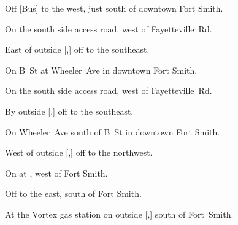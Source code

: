 
\begin{LocationList}

Off [Bus] to the west, just south of downtown Fort Smith.

On the south side  access road, west of  Fayetteville~Rd.

East of  outside [,] off  to the southeast.

On B~St at  Wheeler~Ave in downtown Fort Smith.

On the south side  access road, west of  Fayetteville~Rd.

\Location{\GarageHQ \Garage}
By  outside [,] off  to the southeast.

On  Wheeler~Ave south of B~St in downtown Fort Smith.

West of  outside [,] off  to the northwest.

\Location{\TruckStop \Gas \Rest \Weigh}
On  at , west of Fort Smith.

Off  to the east, south of Fort Smith.

At the Vortex gas station on  outside [,] south of Fort~Smith.

\end{LocationList}
